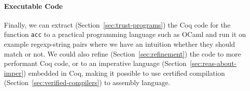 \vspace{-15pt}
\paragraph{Executable Code}
Finally, we can extract (Section~\ref{sec:trust-programs}) the Coq code for the function \lstinline{acc} to a practical programming language such as OCaml and run it on example regexp-string pairs where we have an intuition whether they should match or not. We could also refine (Section~\ref{sec:refinement}) the code to more performant Coq code, or to an imperative language (Section~\ref{sec:reas-about-imper}) embedded in Coq, making it possible to use 
certified compilation (Section~\ref{sec:verified-compilers}) to assembly language.

%



